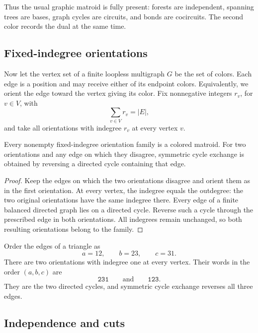 Thus the usual graphic matroid is fully present: forests are independent,
spanning trees are bases, graph cycles are circuits, and bonds are
cocircuits. The second color records the dual at the same time.

\subsection[fixedIndegreeOrientations]{Fixed-indegree orientations}

Now let the vertex set of a finite loopless multigraph $G$ be the set of
colors. Each edge is a position and may receive either of its endpoint
colors. Equivalently, we orient the edge toward the vertex giving its color.
Fix nonnegative integers $r_v$, for $v\in V$, with
\[
 \sum_{v\in V}r_v=|E|,
\]
and take all orientations with indegree $r_v$ at every vertex $v$.

\begin{proposition}
Every nonempty fixed-indegree orientation family is a colored matroid. For
two orientations and any edge on which they disagree, symmetric cycle
exchange is obtained by reversing a directed cycle containing that edge.
\end{proposition}

\begin{proof}
Keep the edges on which the two orientations disagree and orient them as in
the first orientation. At every vertex, the indegree equals the outdegree:
the two original orientations have the same indegree there. Every edge of a
finite balanced directed graph lies on a directed cycle. Reverse such a
cycle through the prescribed edge in both orientations. All indegrees remain
unchanged, so both resulting orientations belong to the family.
\end{proof}

\begin{example}
Order the edges of a triangle as
\[
 a=12,\qquad b=23,\qquad c=31.
\]
There are two orientations with indegree one at every vertex. Their words in
the order $(a,b,c)$ are
\[
 \mathtt{231}\qquad\text{and}\qquad\mathtt{123}.
\]
They are the two directed cycles, and symmetric cycle exchange reverses all
three edges.
\end{example}

\subsection[orientationIndependence]{Independence and cuts}

